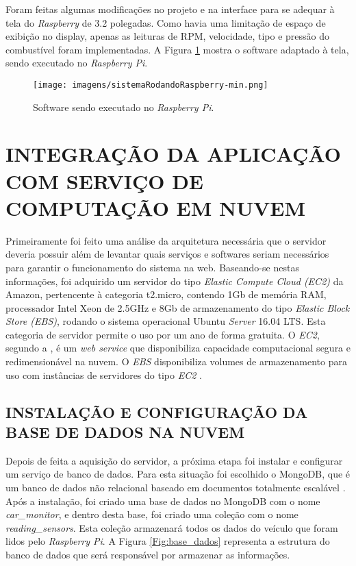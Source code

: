 Foram feitas algumas modificações no projeto e na interface para se adequar à tela do \textit{Raspberry} de 3.2 polegadas. Como havia uma limitação de espaço de exibição no display, apenas as leituras de RPM, velocidade, tipo e pressão do combustível foram implementadas. A Figura \ref{Fig:raspberry_sistema} mostra o software adaptado à tela, sendo executado no \textit{Raspberry Pi}.

\begin{figure}[!ht]
\centering
\caption{Software sendo executado no \textit{Raspberry Pi}.} 
{\texttt{[image: imagens/sistemaRodandoRaspberry-min.png]}}\\
 \label{Fig:raspberry_sistema}
\end{figure}

\section{INTEGRAÇÃO DA APLICAÇÃO COM SERVIÇO DE COMPUTAÇÃO EM NUVEM}
Primeiramente foi feito uma análise da arquitetura necessária que o servidor deveria possuir além de levantar quais serviços e softwares seriam necessários para garantir o funcionamento do sistema na web. Baseando-se nestas informações, foi adquirido um servidor do tipo \textit{Elastic Compute Cloud (EC2)} da Amazon, pertencente à categoria t2.micro, contendo 1Gb de memória RAM, processador Intel Xeon de 2.5GHz e 8Gb de armazenamento do tipo \textit{Elastic Block Store (EBS)}, rodando o sistema operacional Ubuntu \textit{Server} 16.04 LTS. Esta categoria de servidor permite o uso por um ano de forma gratuita. O \textit{EC2}, segundo a , é um \textit{web service} que disponibiliza capacidade computacional segura e redimensionável na nuvem. O \textit{EBS} disponibiliza volumes de armazenamento para uso com instâncias de servidores do tipo \textit{EC2} \nocite{amazonebs}.

\subsection{INSTALAÇÃO E CONFIGURAÇÃO DA BASE DE DADOS NA NUVEM}
Depois de feita a aquisição do servidor, a próxima etapa foi instalar e configurar um serviço de banco de dados. Para esta situação foi escolhido o MongoDB, que é um banco de dados não relacional baseado em documentos totalmente escalável \cite{mongodbwhatis}. Após a instalação, foi criado uma base de dados no MongoDB com o nome \textit{car\_monitor}, e dentro desta base, foi criado uma coleção com o nome \textit{reading\_sensors}. Esta coleção armazenará todos os dados do veículo que foram lidos pelo \textit{Raspberry Pi}. A Figura \ref{Fig:base_dados} representa a estrutura do banco de dados que será responsável por armazenar as informações.

